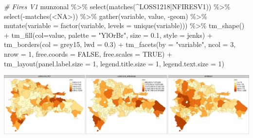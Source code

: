 \documentclass[10pt,landscape,a3paper]{article}
\newenvironment{Shaded}{\begin{snugshade}}{\end{snugshade}}
\newcommand{\AttributeTok}[1]{\textcolor[rgb]{0.77,0.63,0.00}{#1}}
\newcommand{\CommentTok}[1]{\textcolor[rgb]{0.56,0.35,0.01}{\textit{#1}}}
\newcommand{\ConstantTok}[1]{\textcolor[rgb]{0.00,0.00,0.00}{#1}}
\newcommand{\DecValTok}[1]{\textcolor[rgb]{0.00,0.00,0.81}{#1}}
\newcommand{\FloatTok}[1]{\textcolor[rgb]{0.00,0.00,0.81}{#1}}
\newcommand{\FunctionTok}[1]{\textcolor[rgb]{0.00,0.00,0.00}{#1}}
\newcommand{\NormalTok}[1]{#1}
\newcommand{\SpecialCharTok}[1]{\textcolor[rgb]{0.00,0.00,0.00}{#1}}
\newcommand{\StringTok}[1]{\textcolor[rgb]{0.31,0.60,0.02}{#1}}
\begin{document}
\begin{Shaded}
\begin{Highlighting}[]

\CommentTok{\# Fires V1}
\NormalTok{munzonal }\SpecialCharTok{\%\textgreater{}\%} \FunctionTok{select}\NormalTok{(}\FunctionTok{matches}\NormalTok{(}\StringTok{\textquotesingle{}\^{}LOSS1218|NFIRESV1\textquotesingle{}}\NormalTok{)) }\SpecialCharTok{\%\textgreater{}\%} \FunctionTok{select}\NormalTok{(}\SpecialCharTok{{-}}\FunctionTok{matches}\NormalTok{(}\StringTok{\textquotesingle{}\textless{}NA\textgreater{}\textquotesingle{}}\NormalTok{)) }\SpecialCharTok{\%\textgreater{}\%} 
  \FunctionTok{gather}\NormalTok{(variable, value, }\SpecialCharTok{{-}}\NormalTok{geom) }\SpecialCharTok{\%\textgreater{}\%}
  \FunctionTok{mutate}\NormalTok{(}\AttributeTok{variable =} \FunctionTok{factor}\NormalTok{(variable, }\AttributeTok{levels =} \FunctionTok{unique}\NormalTok{(variable))) }\SpecialCharTok{\%\textgreater{}\%} 
  \FunctionTok{tm\_shape}\NormalTok{() }\SpecialCharTok{+}
  \FunctionTok{tm\_fill}\NormalTok{(}\AttributeTok{col=}\StringTok{\textquotesingle{}value\textquotesingle{}}\NormalTok{, }\AttributeTok{palette =} \StringTok{"YlOrBr"}\NormalTok{, }\AttributeTok{size =} \FloatTok{0.1}\NormalTok{, }\AttributeTok{style =} \StringTok{\textquotesingle{}jenks\textquotesingle{}}\NormalTok{) }\SpecialCharTok{+}
  \FunctionTok{tm\_borders}\NormalTok{(}\AttributeTok{col =} \StringTok{\textquotesingle{}grey15\textquotesingle{}}\NormalTok{, }\AttributeTok{lwd =} \FloatTok{0.3}\NormalTok{) }\SpecialCharTok{+}
  \FunctionTok{tm\_facets}\NormalTok{(}\AttributeTok{by =} \StringTok{"variable"}\NormalTok{, }\AttributeTok{ncol =} \DecValTok{3}\NormalTok{, }\AttributeTok{nrow =} \DecValTok{1}\NormalTok{, }\AttributeTok{free.coords =} \ConstantTok{FALSE}\NormalTok{, }\AttributeTok{free.scales =} \ConstantTok{TRUE}\NormalTok{) }\SpecialCharTok{+}
  \FunctionTok{tm\_layout}\NormalTok{(}\AttributeTok{panel.label.size =} \DecValTok{1}\NormalTok{, }\AttributeTok{legend.title.size =} \DecValTok{1}\NormalTok{, }\AttributeTok{legend.text.size =} \DecValTok{1}\NormalTok{)}
\end{Highlighting}
\end{Shaded}

\begin{center}\includegraphics{img/data-download-preparation-eda/zonal-mun-8} \end{center}
\end{document}
